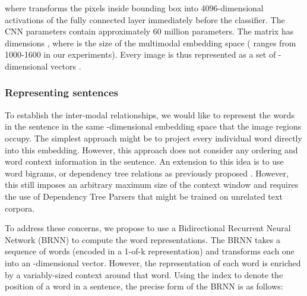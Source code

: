\documentclass[10pt,twocolumn,letterpaper]{article}
\begin{document}
\vspace{-0.15in}

\vspace{-0.2in}

where  transforms the pixels inside bounding box  into 4096-dimensional activations of the fully connected layer immediately before the classifier. The CNN parameters  contain approximately 60 million parameters. The matrix  has dimensions , where  is the size of the multimodal embedding space ( ranges from 1000-1600 in our experiments). Every image is thus represented as a set of -dimensional vectors .

\vspace{-0.1in}
\subsubsection{Representing sentences}
\vspace{-0.15in}

To establish the inter-modal relationships, we would like to represent the words in the sentence in the same -dimensional embedding space that the image regions occupy. The simplest approach might be to project every individual word directly into this embedding. However, this approach does not consider any ordering and word context information in the sentence. An extension to this idea is to use word bigrams, or dependency tree relations as previously proposed \cite{defrag}. However, this still imposes an arbitrary maximum size of the context window and requires the use of Dependency Tree Parsers that might be trained on unrelated text corpora.

To address these concerns, we propose to use a Bidirectional Recurrent Neural Network (BRNN) \cite{schuster1997bidirectional} to compute the word representations. The BRNN takes a sequence of  words (encoded in a 1-of-k representation) and transforms each one into an -dimensional vector. However, the representation of each word is enriched by a variably-sized context around that word. Using the index  to denote the position of a word in a sentence, the precise form of the BRNN is as follows:

\vspace{-0.22in}

\vspace{-0.25in}
\end{document}
